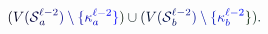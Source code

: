 \documentclass[12pt]{article}
\begin{document}
\makeatletter
\renewcommand*{\@textcolor}[3]{%
  \protect\leavevmode
  \begingroup
    \color#1{#2}#3%
  \endgroup
}
\makeatother
\begin{displaymath}
\mathcolor[RGB]{0,0,15}{(} \mathcolor[RGB]{0,0,30}{V} \mathcolor[RGB]{0,0,45}{(} \mathcal { \mathcolor[RGB]{0,0,60}{S} } _ { \mathcolor[RGB]{0,0,75}{a} } ^ { \mathcolor[RGB]{0,0,90}{\ell} \mathcolor[RGB]{0,0,105}{-} \mathcolor[RGB]{0,0,120}{2} } \mathcolor[RGB]{0,0,135}{)} \mathcolor[RGB]{0,0,150}{\setminus} \mathcolor[RGB]{0,0,165}{\{} \mathcolor[RGB]{0,0,180}{\kappa} _ { \mathcolor[RGB]{0,0,195}{a} } ^ { \mathcolor[RGB]{0,0,210}{\ell} \mathcolor[RGB]{0,0,225}{-} \mathcolor[RGB]{0,0,240}{2} } \mathcolor[RGB]{0,0,255}{\}} \mathcolor[RGB]{0,15,0}{)} \mathcolor[RGB]{0,15,15}{\cup} \mathcolor[RGB]{0,15,30}{(} \mathcolor[RGB]{0,15,45}{V} \mathcolor[RGB]{0,15,60}{(} \mathcal { \mathcolor[RGB]{0,15,75}{S} } _ { \mathcolor[RGB]{0,15,90}{b} } ^ { \mathcolor[RGB]{0,15,105}{\ell} \mathcolor[RGB]{0,15,120}{-} \mathcolor[RGB]{0,15,135}{2} } \mathcolor[RGB]{0,15,150}{)} \mathcolor[RGB]{0,15,165}{\setminus} \mathcolor[RGB]{0,15,180}{\{} \mathcolor[RGB]{0,15,195}{\kappa} _ { \mathcolor[RGB]{0,15,210}{b} } ^ { \mathcolor[RGB]{0,15,225}{\ell} \mathcolor[RGB]{0,15,240}{-} \mathcolor[RGB]{0,15,255}{2} } \mathcolor[RGB]{0,30,0}{\}} \mathcolor[RGB]{0,30,15}{)} \mathcolor[RGB]{0,30,30}{.}
\end{displaymath}
\end{document}
